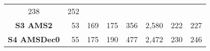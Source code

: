 \begin{longtable}[]{@{}crrrrrrr@{}}
\begin{minipage}[t]{0.08\columnwidth}
238\strut
\end{minipage} & \begin{minipage}[t]{0.14\columnwidth}\raggedleft\strut
252\strut
\end{minipage}\tabularnewline
\begin{minipage}[t]{0.10\columnwidth}\centering\strut
\textbf{S3 AMS2}\strut
\end{minipage} & \begin{minipage}[t]{0.11\columnwidth}\raggedleft\strut
53\strut
\end{minipage} & \begin{minipage}[t]{0.06\columnwidth}\raggedleft\strut
169\strut
\end{minipage} & \begin{minipage}[t]{0.13\columnwidth}\raggedleft\strut
175\strut
\end{minipage} & \begin{minipage}[t]{0.07\columnwidth}\raggedleft\strut
356\strut
\end{minipage} & \begin{minipage}[t]{0.09\columnwidth}\raggedleft\strut
2,580\strut
\end{minipage} & \begin{minipage}[t]{0.08\columnwidth}\raggedleft\strut
222\strut
\end{minipage} & \begin{minipage}[t]{0.14\columnwidth}\raggedleft\strut
227\strut
\end{minipage}\tabularnewline
\begin{minipage}[t]{0.10\columnwidth}\centering\strut
\textbf{S4 AMSDec0}\strut
\end{minipage} & \begin{minipage}[t]{0.11\columnwidth}\raggedleft\strut
55\strut
\end{minipage} & \begin{minipage}[t]{0.06\columnwidth}\raggedleft\strut
175\strut
\end{minipage} & \begin{minipage}[t]{0.13\columnwidth}\raggedleft\strut
190\strut
\end{minipage} & \begin{minipage}[t]{0.07\columnwidth}\raggedleft\strut
477\strut
\end{minipage} & \begin{minipage}[t]{0.09\columnwidth}\raggedleft\strut
2,472\strut
\end{minipage} & \begin{minipage}[t]{0.08\columnwidth}\raggedleft\strut
230\strut
\end{minipage} & \begin{minipage}[t]{0.14\columnwidth}\raggedleft\strut
246\strut
\end{minipage}\tabularnewline
\bottomrule
\end{longtable}